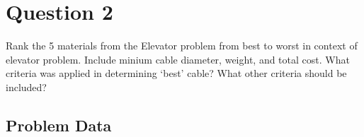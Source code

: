 \documentclass[paper=a4, fontsize=12pt]{scrartcl} %
\numberwithin{equation}{section} %
\numberwithin{figure}{section} %
\numberwithin{table}{section} %
\begin{document}

\section*{Question 2}

Rank the 5 materials from the Elevator problem from best to worst in context of elevator problem. Include minium cable diameter, weight, and total cost. What criteria was applied in determining `best' cable? What other criteria should be included?

\subsection*{Problem Data}
\end{document}
